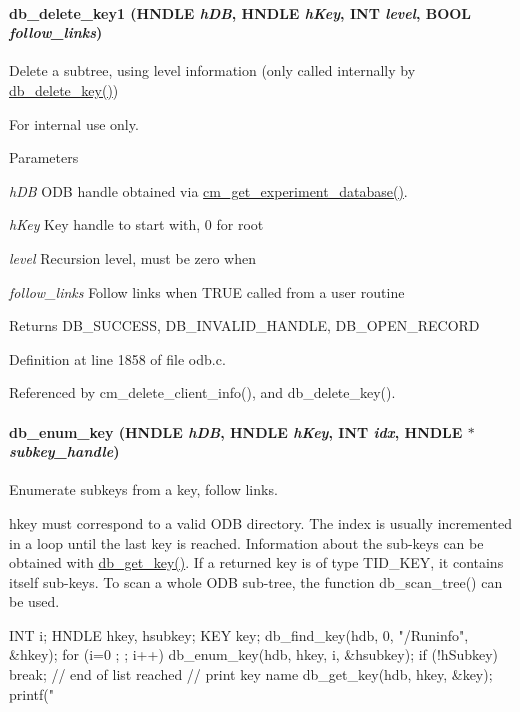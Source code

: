 \paragraph[{db\_\-delete\_\-key1}]{ db\_\-delete\_\-key1 (HNDLE {\em hDB}, \/  HNDLE {\em hKey}, \/  {\bf INT} {\em level}, \/  {\bf BOOL} {\em follow\_\-links})}\hfill\label{group__odbfunctionc_ga3015b0f8e9636ebfeeea74e1dbdfaf62}
Delete a subtree, using level information (only called internally by \hyperlink{group__odbfunctionc_ga50caf089afbb03943e6e215661b5b73e}{db\_\-delete\_\-key()}) \begin{DoxyInternal}{For internal use only.}

\begin{DoxyParams}{Parameters}
\item[{\em hDB}]ODB handle obtained via \hyperlink{group__cmfunctionc_ga16b33b70783a3f5ba98b4094149d12b7}{cm\_\-get\_\-experiment\_\-database()}. \item[{\em hKey}]Key handle to start with, 0 for root \item[{\em level}]Recursion level, must be zero when \item[{\em follow\_\-links}]Follow links when TRUE called from a user routine \end{DoxyParams}
\begin{DoxyReturn}{Returns}
DB\_\-SUCCESS, DB\_\-INVALID\_\-HANDLE, DB\_\-OPEN\_\-RECORD 
\end{DoxyReturn}
\end{DoxyInternal}


Definition at line 1858 of file odb.c.

Referenced by cm\_\-delete\_\-client\_\-info(), and db\_\-delete\_\-key().
\paragraph[{db\_\-enum\_\-key}]{ db\_\-enum\_\-key (HNDLE {\em hDB}, \/  HNDLE {\em hKey}, \/  {\bf INT} {\em idx}, \/  HNDLE $\ast$ {\em subkey\_\-handle})}\hfill\label{group__odbfunctionc_gac7c23e0ebd6b203c81ca491db5b4753e}
Enumerate subkeys from a key, follow links.

hkey must correspond to a valid ODB directory. The index is usually incremented in a loop until the last key is reached. Information about the sub-\/keys can be obtained with \hyperlink{group__odbfunctionc_ga424ad3b166e3fba9bae29f7dfc74a369}{db\_\-get\_\-key()}. If a returned key is of type TID\_\-KEY, it contains itself sub-\/keys. To scan a whole ODB sub-\/tree, the function db\_\-scan\_\-tree() can be used. 
\begin{DoxyCode}
INT   i;
HNDLE hkey, hsubkey;
KEY   key;
  db_find_key(hdb, 0, "/Runinfo", &hkey);
  for (i=0 ; ; i++)
  {
   db_enum_key(hdb, hkey, i, &hsubkey);
   if (!hSubkey)
    break; // end of list reached
   // print key name
   db_get_key(hdb, hkey, &key);
   printf("%
  }
\end{DoxyCode}
 

